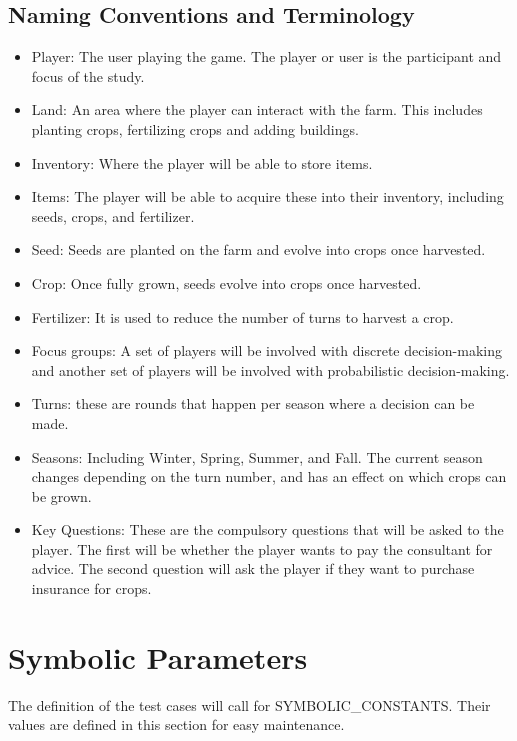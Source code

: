 \documentclass{article}
\begin{document}
\subsection{Naming Conventions and Terminology}
\begin{itemize}
    \item Player: The user playing the game. The player or user is the participant and focus of the study.
    \item Land: An area where the player can interact with the farm. This includes planting crops, fertilizing crops and adding buildings.
    \item Inventory: Where the player will be able to store items.
    \item Items: The player will be able to acquire these into their inventory, including seeds, crops, and fertilizer.
    \item Seed: Seeds are planted on the farm and evolve into crops once harvested.
    \item Crop: Once fully grown, seeds evolve into crops once harvested.
    \item Fertilizer: It is used to reduce the number of turns to harvest a crop.
    \item Focus groups: A set of players will be involved with discrete decision-making and another set of players will be involved with probabilistic decision-making.
    \item Turns: these are rounds that happen per season where a decision can be made. 
    \item Seasons: Including Winter, Spring, Summer, and Fall. The current season changes depending on the turn number, and has an effect on which crops can be grown. 
    \item Key Questions: These are the compulsory questions that will be asked to the player. The first will be whether the player wants to pay the consultant for advice. The second question will ask the player if they want to purchase insurance for crops.
\end{itemize}
\section{Symbolic Parameters}

The definition of the test cases will call for SYMBOLIC\_CONSTANTS.
Their values are defined in this section for easy maintenance.

\begin{table}[h]
\caption{\bf Symbolic Parameter Table}
\end{table}
\end{document}
